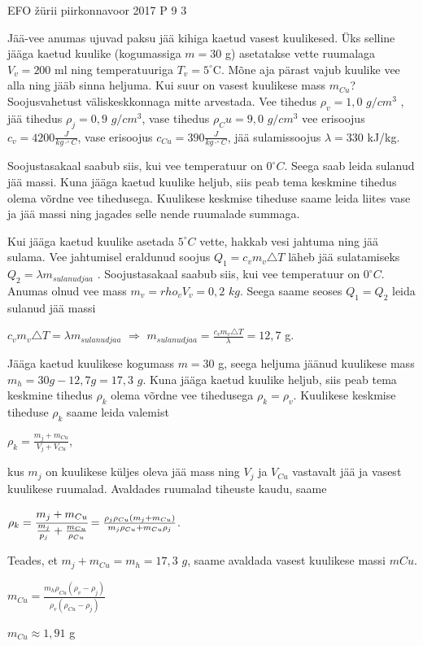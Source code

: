 {EFO žürii} %
{piirkonnavoor} %
{2017} %
{P 9} %
{3} %
{

\ifStatement
Jää-vee anumas ujuvad paksu jää kihiga kaetud vasest kuulikesed. Üks selline jääga kaetud kuulike (kogumassiga $m = 30$ g) asetatakse vette ruumalaga $V_v = 200$ ml ning temperatuuriga $T_v = 5 ^{\circ}$C. Mõne aja pärast vajub kuulike vee alla ning jääb sinna heljuma. Kui suur on vasest kuulikese mass $m_{Cu}$? Soojusvahetust väliskeskkonnaga mitte arvestada. Vee tihedus $\rho_v = 1,0$ $g/cm^3$ , jää tihedus $\rho_j = 0,9$ $g/cm^3$, vase tihedus $\rho_Cu = 9,0$ $g/cm^3$ vee erisoojus $c_v = 4200  \frac{J}{kg \cdot ^{\circ}C}$, vase erisoojus $c_{Cu} = 390 \frac{J}{kg \cdot ^{\circ}C}$, jää sulamissoojus $\lambda = 330$ kJ/kg.
\fi

\ifHint
Soojustasakaal saabub siis, kui vee temperatuur on $0^{\circ}C$. Seega saab leida sulanud jää massi. Kuna jääga kaetud kuulike heljub, siis peab tema keskmine tihedus olema võrdne vee tihedusega. Kuulikese keskmise tiheduse saame leida liites vase ja jää massi ning jagades selle nende ruumalade summaga. 
\fi

\ifSolution
Kui jääga kaetud kuulike asetada $5 ^{\circ}C$ vette, hakkab vesi jahtuma ning jää sulama. Vee jahtumisel eraldunud soojus $Q_1 = c_v m_v \triangle T$ läheb jää sulatamiseks $Q_2 = \lambda m_{sulanud jaa}$ . Soojustasakaal saabub siis, kui vee temperatuur on $0^{\circ}C$. Anumas olnud vee mass $m_v = rho_v V_v = 0,2$ $kg$. Seega saame seoses $Q_1 = Q_2$ leida sulanud jää massi 
\begin{center}
$c_v m_v \triangle T = \lambda m_{sulanud jaa}$ $\Rightarrow$ $m_{sulanud jaa} = \frac{c_v m_v \triangle T} {\lambda} = 12,7$ g.
\end{center}
Jääga kaetud kuulikese kogumass $m = 30$ g, seega heljuma jäänud kuulikese mass $m_h = 30 g - 12,7 g = 17,3$ $g$. Kuna jääga kaetud kuulike heljub, siis peab tema keskmine tihedus $\rho_k$ olema võrdne vee tihedusega $\rho_k = \rho_v$. Kuulikese keskmise tiheduse $\rho_k$ saame leida valemist
\begin{center}
$\rho_k = \frac{m_j + m_{Cu}}{V_j + V_{Cu}}$,
\end{center}
kus $m_j$ on kuulikese küljes oleva jää mass ning $V_j$ ja $V_{Cu}$ vastavalt jää ja vasest kuulikese ruumalad. Avaldades ruumalad tiheuste kaudu, saame
\begin{center}
$\rho_k = \cfrac{m_j + m_{Cu}}{\frac{m_j}{p_j} + \frac{m_{Cu}}{\rho_{Cu}}} = \frac{\rho_j \rho_{Cu} (m_j + m_{Cu})}{m_j \rho_{Cu} + m_{Cu} \rho_{j}}$.
\end{center}
Teades, et $m_j + m_{Cu} = m_h = 17,3$ $g$, saame avaldada vasest kuulikese massi $m{Cu}$.
\begin{center}
$m_{Cu} = \frac{m_h \rho_{Cu}(\rho_v - \rho_j)}{\rho_v (\rho_{Cu} - \rho_j)}$
\end{center}
\begin{center}
$m_{Cu} \approx 1,91$ g
\end{center}
\fi
}